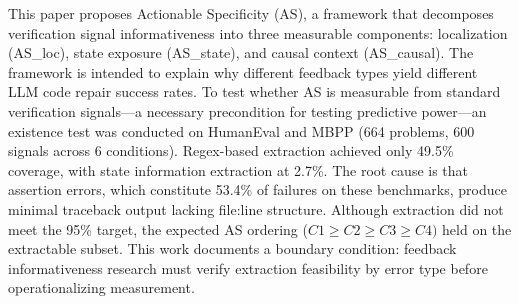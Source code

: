 
This paper proposes Actionable Specificity (AS), a framework that decomposes verification signal informativeness into three measurable components: localization (AS\_loc), state exposure (AS\_state), and causal context (AS\_causal). The framework is intended to explain why different feedback types yield different LLM code repair success rates. To test whether AS is measurable from standard verification signals---a necessary precondition for testing predictive power---an existence test was conducted on HumanEval and MBPP (664 problems, 600 signals across 6 conditions). Regex-based extraction achieved only 49.5\% coverage, with state information extraction at 2.7\%. The root cause is that assertion errors, which constitute 53.4\% of failures on these benchmarks, produce minimal traceback output lacking file:line structure. Although extraction did not meet the 95\% target, the expected AS ordering ($C1\geq C2\geq C3\geq C4)$ held on the extractable subset. This work documents a boundary condition: feedback informativeness research must verify extraction feasibility by error type before operationalizing measurement.

